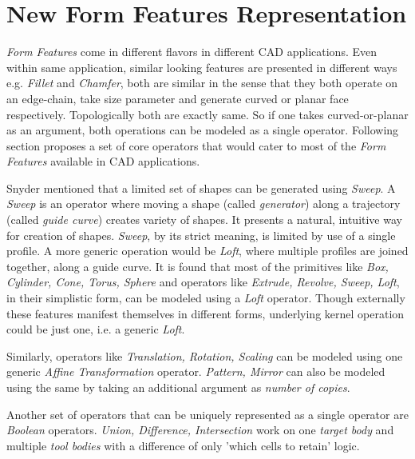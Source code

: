 \newcommand{\loft}[5]{\ensuremath{\Omega{\bf \mathcal{L}}_{#1}^{#2,#3} [\{#4\} (#5)]}}
\newcommand{\affine}[5]{\ensuremath{\Delta{\bf \mathcal{A}}_{#1}^{#2,#3} [\{#4\} (#5)]}}
\newcommand{\boolop}[5]{\ensuremath{\Omega{\bf  \mathcal{B}}_{#1}^{#2,#3} [\{#4\} (#5)]}}
\newcommand{\generic}[7]{\ensuremath{#1{\bf \mathcal{#2}}_{#3}^{#4,#5} [\{#6\} (#7)]}}


\section{New Form Features Representation}

{\em Form Features} come in different flavors in different CAD applications. Even within same application, similar looking features are presented in different ways e.g.  {\em Fillet} and {\em Chamfer}, both are similar in the sense that they both operate on an edge-chain, take size parameter and generate curved or planar face respectively. Topologically both are exactly same. So if one takes curved-or-planar as an argument, both operations can be modeled as a single operator. Following section proposes a set of core operators that would cater to most of the {\em Form Features} available in CAD applications. 

Snyder \cite{Snyder1992} mentioned that a limited set of shapes can be generated using {\em Sweep}. A {\em Sweep} is an operator where moving a shape (called {\em generator}) along a trajectory (called {\em guide curve}) creates variety of shapes. It presents a natural, intuitive way for creation of shapes. {\em Sweep}, by its strict meaning, is limited by use of a single profile. A more generic operation would be {\em Loft}, where multiple profiles are joined together, along a guide curve. It is found that most of the primitives like {\em Box, Cylinder, Cone, Torus, Sphere} and operators like {\em Extrude, Revolve, Sweep, Loft}, in their simplistic form, can be modeled using a {\em Loft} operator. Though externally these features manifest themselves in different forms, underlying kernel operation could be just one, i.e. a generic {\em Loft}.

Similarly, operators like {\em Translation, Rotation, Scaling} can be modeled using one generic {\em Affine Transformation} operator. {\em Pattern, Mirror} can also be modeled using the same by taking an additional argument as {\em number of copies}.

Another set of operators that can be uniquely represented as a single operator are {\em  Boolean} operators. {\em Union, Difference, Intersection} work on one {\em target body} and multiple {\em tool bodies} with a difference of only  'which cells to retain' logic.

